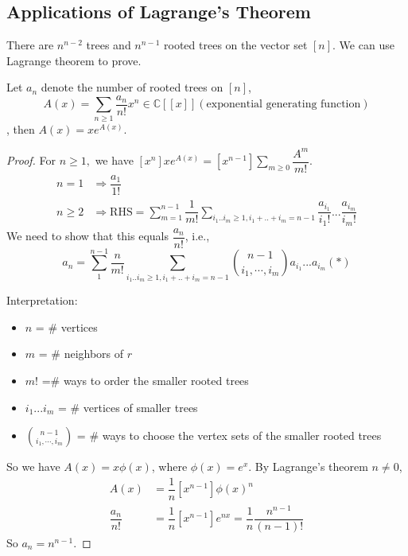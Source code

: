 \subsection{Applications of Lagrange's Theorem}
\begin{theorem}
There are $n^{n-2}$ trees and $n^{n-1}$ rooted trees on the vector set $[n]$. We can use Lagrange theorem to prove.
\end{theorem}

\begin{proposition}
Let $a_n$ denote the number of rooted trees on $[n]$, $$A(x)=\sum\limits_{n\geq 1} \dfrac{a_n}{n!}x^n \in \mathbb{C}[[x]] (\text{exponential generating function})$$, then $A(x)=xe^{A(x)}$.
\end{proposition}
\begin{proof}
For $n\geq 1,$ we have $[x^n]xe^{A(x)}=[x^{n-1}]\sum\limits_{m\geq 0}\dfrac{A^m}{m!}.$
\begin{align*}
n=1  &\Rightarrow \dfrac{a_1}{1!}\\
n\geq 2 &\Rightarrow \text{RHS}=\sum\limits_{m=1}^{n-1}\dfrac{1}{m!}\sum\limits_{i_1..i_m\geq 1, i_1+..+i_m=n-1} \dfrac{a_{i_1}}{i_1!} ...\dfrac{a_{i_m}}{i_m!}
\end{align*}
We need to show that this equals $\dfrac{a_n}{n!}$, i.e.,$$a_n=\sum\limits_1^{n-1}\dfrac{n}{m!}\sum\limits_{i_1..i_m\geq 1, i_1+..+i_m=n-1}{\binom{n-1}{i_1,\cdots,i_m}}a_{i_1}...a_{i_m}(*)$$

Interpretation:
\begin{itemize}
\item $n$ = \# vertices
\item $m$ = \# neighbors of $r$
\item $m!$ =\# ways to order the smaller rooted trees
\item $i_1...i_m$ = \# vertices of smaller trees
\item $\binom{n-1}{i_1,\cdots,i_m}$ = \# ways  to choose the vertex sets of the smaller rooted trees
\end{itemize}

So we have $A(x)=x\phi(x)$, where $\phi(x)=e^x$. By Lagrange's theorem $n\neq 0$,
\begin{align*}
[x^n]A(x)&=\dfrac{1}{n}[x^{n-1}]\phi(x)^n\\
\dfrac{a_n}{n!}&=\dfrac{1}{n}[x^{n-1}]e^{nx} =\dfrac{1}{n}\dfrac{n^{n-1}}{(n-1)!}
\end{align*}
So $a_n=n^{n-1}.$
\end{proof}


